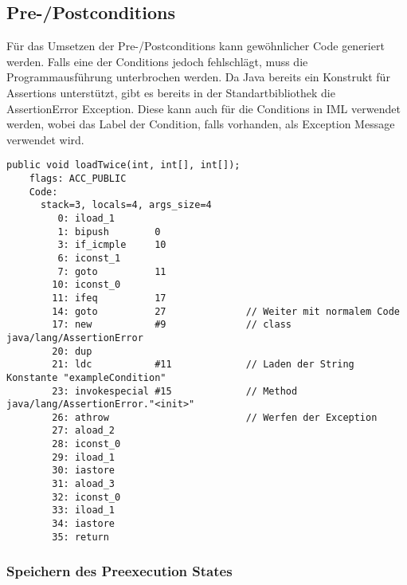 \subsection{Pre-/Postconditions}

Für das Umsetzen der Pre-/Postconditions kann gewöhnlicher Code generiert werden. Falls eine der Conditions
jedoch fehlschlägt, muss die Programmausführung unterbrochen werden. Da Java bereits ein Konstrukt für 
Assertions unterstützt, gibt es bereits in der Standartbibliothek die AssertionError Exception.
Diese kann auch für die Conditions in IML verwendet werden, wobei das Label der Condition, falls vorhanden,
als Exception Message verwendet wird.
\newline

\begin{lstlisting}[caption=Bytecode der loadTwice Prozedur mit precondition,label={lst:loadtwice_code_precond}]
public void loadTwice(int, int[], int[]);
    flags: ACC_PUBLIC
    Code:
      stack=3, locals=4, args_size=4
         0: iload_1       
         1: bipush        0
         3: if_icmple     10
         6: iconst_1      
         7: goto          11
        10: iconst_0      
        11: ifeq          17
        14: goto          27              // Weiter mit normalem Code
        17: new           #9              // class java/lang/AssertionError
        20: dup         
        21: ldc           #11             // Laden der String Konstante "exampleCondition"
        23: invokespecial #15             // Method java/lang/AssertionError."<init>"
        26: athrow                        // Werfen der Exception
        27: aload_2       
        28: iconst_0      
        29: iload_1       
        30: iastore       
        31: aload_3       
        32: iconst_0      
        33: iload_1       
        34: iastore       
        35: return  
\end{lstlisting}

\subsubsection{Speichern des Preexecution States}


